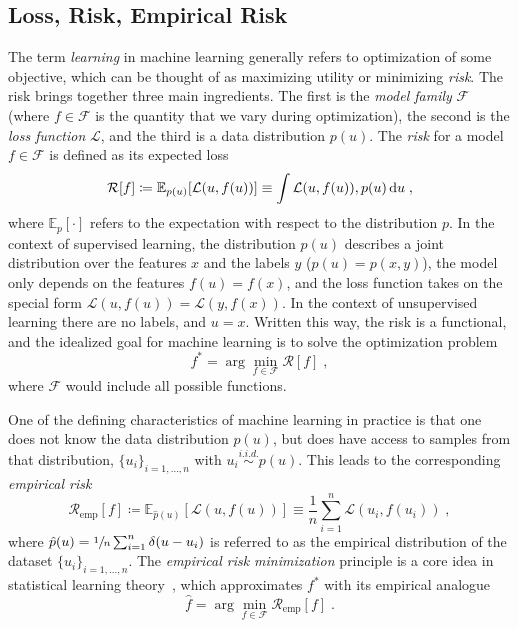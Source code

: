 \subsection{Loss, Risk, Empirical Risk}

The term \textit{learning} in machine learning generally refers to optimization of some objective, which can be thought of as maximizing utility or minimizing \textit{risk}. The risk brings together three main ingredients. The first is the \textit{model family} $\mathcal{F}$ (where $f\in \mathcal{F}$ is the quantity that we vary during optimization), the second is the \textit{loss function} $\mathcal{L}$, and the third is a data distribution $p(u)$. 
The \textit{risk} for a model $f\in \mathcal{F}$ is defined as its expected loss
\begin{equation}
    \label{ML:eq:risk}
    \mathcal{R}[f] \coloneqq \mathbb{E}_{p(u)}[\mathcal{L}(u, f(u))] \equiv \int \mathcal{L}(u, f(u)), p(u) \mathop{}\!\mathrm{d} u \;,
\end{equation}
where $\mathbb{E}_p[\cdot]$ refers to the expectation with respect to the distribution $p$.
In the context of supervised learning, the distribution $p(u)$ describes a joint distribution over the features $x$ and the labels $y$ (\ie $p(u)=p(x,y)$), the model only depends on the features $f(u)=f(x)$, and the loss function takes on the special form $\mathcal{L}(u, f(u)) = \mathcal{L}(y, f(x))$. In the context of unsupervised learning there are no labels, and $u = x$. Written this way, the risk is a functional, and the idealized goal for machine learning is to solve the optimization problem
\begin{equation}
    \label{ML:eq:fstar}
    f^{*}=\arg \min _{{f\in {\mathcal{F}}}}\mathcal{R}[f] \; , 
\end{equation}
where $\mathcal{F}$ would include all possible functions. %



One of the defining characteristics of machine learning in practice is that one does not know the data distribution $p(u)$, but does have access to samples from that distribution, \ie $\{u_i\}_{i=1,\dots,n}$ with $u_i \overset{i.i.d.}{\sim} p(u)$. This leads to the corresponding \textit{empirical risk}
\begin{equation}
    \label{ml:eq:Remp}
        \mathcal{R}_\textrm{emp}[f] \coloneqq \mathbb{E}_{\hat{p}(u)}[\mathcal{L}(u, f(u))] \equiv \frac{1}{n} \sum_{i=1}^n  \mathcal{L}(u_i, f(u_i)) \;,
\end{equation}
where $\hat{p}(u) = \sfrac{1}{n} \sum_{i=1}^n \delta(u - u_i)$ is referred to as the empirical distribution of the dataset $\{u_i\}_{i=1,\dots,n}$. 
The \textit{empirical risk minimization} principle is a core idea in statistical learning theory~\cite{vapnik2013nature}, which approximates $f^*$ with its empirical analogue
\begin{equation}
    \label{ML:eq:fhat}
    \hat{f}=\arg \min _{{f\in {\mathcal{F}}}}\mathcal{R}_\textrm{emp}[f] \; .
\end{equation}

